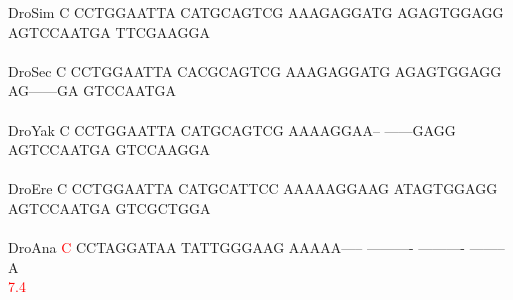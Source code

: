 \documentclass[11pt,twoside,reqno,a4paper]{article}
\begin{document}
{DroSim	C	CCTGGAATTA	CATGCAGTCG	AAAGAGGATG	AGAGTGGAGG	AGTCCAATGA	TTCGAAGGA\\
\hspace*{7\charwidth}\hspace*{1\charwidth}\hspace*{1\charwidth}\hspace*{1\charwidth}\hspace*{1\charwidth}\hspace*{1\charwidth}\hspace*{1\charwidth}\\
DroSec	C	CCTGGAATTA	CACGCAGTCG	AAAGAGGATG	AGAGTGGAGG	AG------GA	GTCCAATGA\\
\hspace*{7\charwidth}\hspace*{1\charwidth}\hspace*{1\charwidth}\hspace*{1\charwidth}\hspace*{1\charwidth}\hspace*{1\charwidth}\hspace*{1\charwidth}\\
DroYak	C	CCTGGAATTA	CATGCAGTCG	AAAAGGAA--	------GAGG	AGTCCAATGA	GTCCAAGGA\\
\hspace*{7\charwidth}\hspace*{1\charwidth}\hspace*{1\charwidth}\hspace*{1\charwidth}\hspace*{1\charwidth}\hspace*{1\charwidth}\hspace*{1\charwidth}\\
DroEre	C	CCTGGAATTA	CATGCATTCC	AAAAAGGAAG	ATAGTGGAGG	AGTCCAATGA	GTCGCTGGA\\
\hspace*{7\charwidth}\hspace*{1\charwidth}\hspace*{1\charwidth}\hspace*{1\charwidth}\hspace*{1\charwidth}\hspace*{1\charwidth}\hspace*{1\charwidth}\\
DroAna	\textcolor{Red}{C}	CCTAGGATAA	TATTGGGAAG	AAAAA-----	----------	----------	--------A\\
\hspace*{7\charwidth}\hspace*{0\charwidth}\textcolor{Red}{7.4}\hspace*{1\charwidth}\hspace*{1\charwidth}\hspace*{1\charwidth}\hspace*{1\charwidth}\hspace*{1\charwidth}\hspace*{1\charwidth}\\
}
\end{document}
